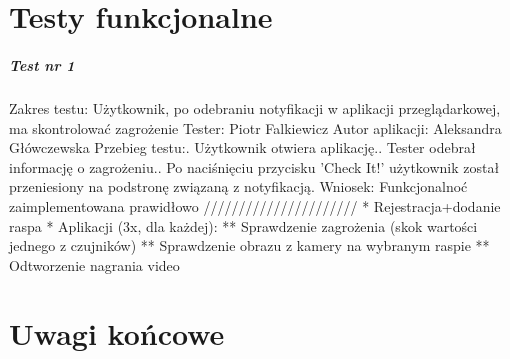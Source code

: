 \chapter{Testy funkcjonalne}


\paragraph{Test nr 1}
Zakres testu:\newline
Użytkownik, po odebraniu notyfikacji w aplikacji przeglądarkowej, ma skontrolować zagrożenie\newline
Tester: Piotr Falkiewicz\newline
Autor aplikacji: Aleksandra Główczewska\newline
Przebieg testu:. Użytkownik otwiera aplikację.. Tester odebrał informację o zagrożeniu.. Po naciśnięciu przycisku 'Check It!' użytkownik został przeniesiony na podstronę związaną z notyfikacją.\newline
Wniosek:\newline
Funkcjonalnoć zaimplementowana prawidłowo\newline
\newline
//////////////////////\newline
 * Rejestracja+dodanie raspa\newline
 * Aplikacji (3x, dla każdej):\newline
 ** Sprawdzenie zagrożenia (skok wartości jednego z czujników)\newline
 ** Sprawdzenie obrazu z kamery na wybranym raspie\newline
 ** Odtworzenie nagrania video\newline

\chapter{Uwagi końcowe}

